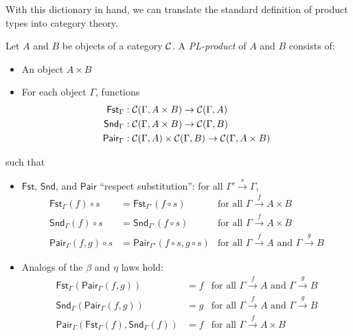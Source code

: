 With this dictionary in hand, we can translate the standard definition of product types into category theory.

\begin{definition}[PL-product]
  \sloppy
  Let \(A\) and \(B\) be objects of a category \(\mathcal C\).
  A \emph{PL-product} of \(A\) and \(B\) consists of:
  \begin{itemize}
  \item An object \(A \times B\)
  \item For each object \(\Gamma\), functions
    \begin{align*}
      \mathsf{Fst}_\Gamma &: \mathcal C(\Gamma,A\times B) \to \mathcal C(\Gamma,A) \\
      \mathsf{Snd}_\Gamma &: \mathcal C(\Gamma,A\times B) \to \mathcal C(\Gamma,B) \\
      \mathsf{Pair}_\Gamma &: \mathcal C(\Gamma,A)\times\mathcal C(\Gamma,B) \to \mathcal C(\Gamma,A\times B)
    \end{align*}
  \end{itemize}
  such that
  \begin{itemize}
  \item \(\mathsf{Fst}\), \(\mathsf{Snd}\), and \(\mathsf{Pair}\) ``respect substitution'': for all
    \(\Gamma'\xrightarrow{s}\Gamma\),
    \begin{align*}
      \mathsf{Fst}_{\Gamma}(f)\circ s &= \mathsf{Fst}_{\Gamma'}(f \circ s) & \text{for all \(\Gamma\xrightarrow{f} A \times B\)} \\
      \mathsf{Snd}_{\Gamma}(f)\circ s &= \mathsf{Snd}_{\Gamma'}(f \circ s) & \text{for all \(\Gamma\xrightarrow{f} A \times B\)} \\
      \mathsf{Pair}_{\Gamma}(f,g)\circ s &= \mathsf{Pair}_{\Gamma'}(f \circ s,g\circ s) & \text{for all \(\Gamma\xrightarrow{f} A\) and \(\Gamma\xrightarrow{g} B\)}
    \end{align*}
  \item Analogs of the \(\beta\) and \(\eta\) laws hold:
    \begin{align*}
      \mathsf{Fst}_{\Gamma}(\mathsf{Pair}_{\Gamma}(f,g)) &= f   & \text{for all \(\Gamma\xrightarrow{f} A\) and \(\Gamma\xrightarrow{g} B\)} \\
      \mathsf{Snd}_{\Gamma}(\mathsf{Pair}_{\Gamma}(f,g)) &= g   & \text{for all \(\Gamma\xrightarrow{f} A\) and \(\Gamma\xrightarrow{g} B\)} \\
      \mathsf{Pair}_\Gamma(\mathsf{Fst}_\Gamma(f),\mathsf{Snd}_\Gamma(f)) &= f   & \text{for all \(\Gamma\xrightarrow{f} A\times B\)}
    \end{align*}
  \end{itemize}
\end{definition}

